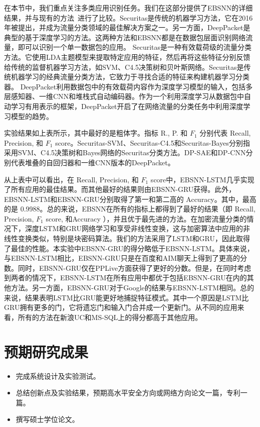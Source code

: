 \documentclass[degree=master,cjk-font=noto]{thuthesis}
\begin{document}
在本节中，我们重点关注多类应用识别任务。我们在这部分提供了EBSNN的详细结果，并与现有的方法~\cite{deep_packet,b25}进行了比较。Securitas是传统的机器学习方法，它在2016年被提出，并成为流量分类领域的最佳解决方案之一。另一方面，DeepPacket是典型的基于深度学习的方法。这两种方法和EBSNN都是在数据包层面识别网络流量，即可以识别一个单一数据包的应用。
Securitas是一种有效载荷级的流量分类方法。它使用LDA主题模型来提取特定应用的特征，然后再将这些特征分别反馈给传统的监督机器学习方法，如SVM、C4.5决策树和贝叶斯网络。Securitas是传统机器学习的经典流量分类方法，它致力于寻找合适的特征来构建机器学习分类器。
DeepPacket利用数据包中的有效载荷内容作为深度学习模型的输入，包括多层感知器、一维CNN和堆栈式自动编码器。作为一个利用深度学习从数据包中自动学习有用表示的框架，DeepPacket开启了在网络流量的分类任务中利用深度学习模型的趋势。

实验结果如上表所示，其中最好的是粗体字。指标 R., P. 和 $F_1$ 分别代表 Recall, Precision, 和 $F_1$ score。Securitas-SVM、Securitas-C4.5和Securitas-Bayes分别指采用SVM、C4.5决策树和Bayes网络的Securitas分类方法。DP-SAE和DP-CNN分别代表堆叠的自回归器和一维CNN版本的DeepPacket。

从上表中可以看出，在 Recall, Precision, 和 $F_1$ score中，EBSNN-LSTM几乎实现了所有应用的最佳结果。而其他最好的结果则由EBSNN-GRU获得。此外，EBSNN-LSTM和EBSNN-GRU分别取得了第一和第二高的 Accuracy。其中，最高的是 0.9988。总的来说，EBSNN在所有的指标上都得到了最好的结果（即 Recall, Precision, $F_1$ score, 和Accuracy ），并且优于最先进的方法。在加密流量分类的情况下，深度LSTM和GRU网络学习和享受非线性变换，这与加密算法中应用的非线性变换类似，特别是块密码算法。我们的方法采用了LSTM和GRU，因此取得了最佳的性能。本实验中EBSNN-GRU的得分略低于EBSNN-LSTM。具体来说，与EBSNN-LSTM相比，EBSNN-GRU只是在百度和AIM聊天上得到了更高的分数。同时，EBSNN-GRU仅在PPLive方面获得了更好的分数。但是，在同时考虑到两者的情况下，EBSNN-LSTM在所有应用中都优于包括EBSNN-GRU在内的其他方法。另一方面，EBSNN-GRU对于Google的结果与EBSNN-LSTM相同。总的来说，结果表明LSTM比GRU能更好地捕捉特征模式。其中一个原因是LSTM比GRU拥有更多的门，它将遗忘门和输入门合并成一个更新门。从不同的应用来看，所有的方法在新浪UC和MS-SQL上的得分都高于其他应用。


\chapter{预期研究成果}

\begin{itemize}
	\item 完成系统设计及实验测试。
	\item 总结创新点及实验结果，预期高水平安全方向或网络方向论文一篇，专利一篇。
	\item 撰写硕士学位论文。
\end{itemize}
\end{document}
